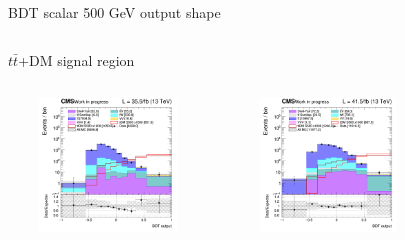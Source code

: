 \documentclass[8pt]{beamer}
\begin{document}
\begin{frame}{BDT scalar 500 GeV output shape}
\vspace{-8pt}
\begin{columns}
\begin{column}{1.09\textwidth}
\begin{block}{\centering $t \bar t$+DM signal region}\end{block} \vspace{10pt}
\end{column}
\end{columns} \vspace{-16pt}
\begin{columns}
		\begin{column}{0.33\textwidth}
			\begin{center}
     			\includegraphics[width=1.0\textwidth, height=100pt]{figs/2016/SmearSR-ttDM-scalar500/log_cratio_topCR_ll_TTbar_BDT_output_scalar500_customBinsAttempt7.png}
    		\end{center}		
		\end{column}
		\begin{column}{0.33\textwidth}
			\begin{center}
     			\includegraphics[width=1.0\textwidth, height=100pt]{figs/2017/SmearSR-ttDM-scalar500/log_cratio_topCR_ll_TTbar_BDT_output_scalar500_customBinsAttempt7.png}
    		\end{center}		
		\end{column}
		\begin{column}{0.33\textwidth}
			\begin{center}

\end{center}
\end{column}
\end{columns}
\end{frame}
\end{document}
